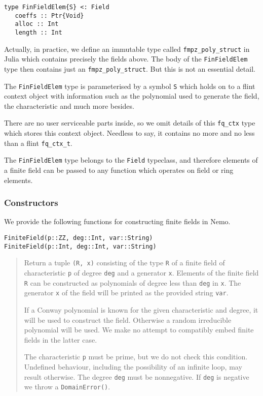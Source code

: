 \documentclass[a4paper,10pt]{article}
\newcommand{\code}{\lstinline}
\newcommand{\desc}[1]{\vspace{-3mm}\begin{quote}#1\end{quote}}
\begin{document}
{{{\begin{lstlisting}
type FinFieldElem{S} <: Field
   coeffs :: Ptr{Void}
   alloc :: Int
   length :: Int
\end{lstlisting}

Actually, in practice, we define an immutable type called 
\code{fmpz_poly_struct} in Julia which contains precisely the fields above. The
body of the \code{FinFieldElem} type then contains just an
\code{fmpz_poly_struct}. But this is not an essential detail.

The \code{FinFieldElem} type is parameterised by a symbol \code{S} which holds
on to a flint context object with information such as the polynomial used to
generate the field, the characteristic and much more besides.

There are no user serviceable parts inside, so we omit details of this 
\code{fq_ctx} type which stores this context object. Needless to say, it
contains no more and no less than a flint \code{fq_ctx_t}.

The \code{FinFieldElem} type belongs to the \code{Field} typeclass, and
therefore elements of a finite field can be passed to any function which
operates on field or ring elements.

\subsubsection{Constructors}

We provide the following functions for constructing finite fields in Nemo.

\begin{lstlisting}
FiniteField(p::ZZ, deg::Int, var::String)
FiniteField(p::Int, deg::Int, var::String)
\end{lstlisting}

\desc{Return a tuple \code{(R, x)} consisting of the type \code{R} of a finite
field of characteristic \code{p} of degree \code{deg} and a generator \code{x}.
Elements of the finite field \code{R} can be constructed as polynomials of
degree less than \code{deg} in \code{x}. The generator \code{x} of the field 
will be printed as the provided string \code{var}.

If a Conway polynomial is known for the given characteristic and degree, it
will be used to construct the field. Otherwise a random irreducible polynomial
will be used. We make no attempt to compatibly embed finite fields in the
latter case.

The characteristic \code{p} must be prime, but we do not check this condition.
Undefined behaviour, including the possibility of an infinite loop, may result
otherwise. The degree \code{deg} must be nonnegative. If \code{deg} is 
negative we throw a \code{DomainError()}.}

}}}
\end{document}

